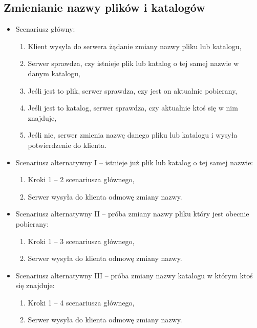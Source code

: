 \documentclass[10pt,a4paper]{article}
\begin{document}
\subsection{Zmienianie nazwy plików i katalogów}
\begin{itemize}
    \item Scenariusz główny:
    \begin{enumerate}
        \item Klient wysyła do serwera żądanie zmiany nazwy pliku lub katalogu,
        \item Serwer sprawdza, czy istnieje plik lub katalog o tej samej nazwie w danym katalogu,
        \item Jeśli jest to plik, serwer sprawdza, czy jest on aktualnie pobierany,
        \item Jeśli jest to katalog, serwer sprawdza, czy aktualnie ktoś się w nim znajduje,
        \item Jeśli nie, serwer zmienia nazwę danego pliku lub katalogu i wysyła potwierdzenie do klienta.
    \end{enumerate}
    
    \item Scenariusz alternatywny I -- istnieje już plik lub katalog o tej samej nazwie:
    \begin{enumerate}
        \item Kroki 1 -- 2 scenariusza głównego,
        \item Serwer wysyła do klienta odmowę zmiany nazwy.
    \end{enumerate}

    \item Scenariusz alternatywny II -- próba zmiany nazwy pliku który jest obecnie pobierany:
    \begin{enumerate}
        \item Kroki 1 -- 3 scenariusza głównego,
        \item Serwer wysyła do klienta odmowę zmiany nazwy.
    \end{enumerate}
    
    \item Scenariusz alternatywny III -- próba zmiany nazwy katalogu w którym ktoś się znajduje:
    \begin{enumerate}
        \item Kroki 1 -- 4 scenariusza głównego,
        \item Serwer wysyła do klienta odmowę zmiany nazwy.
    \end{enumerate}
\end{itemize}
\end{document}
